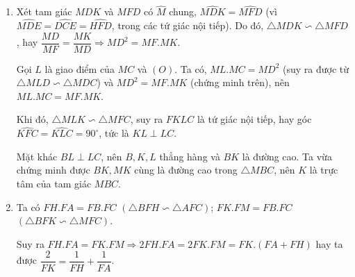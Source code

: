 \begin{ex}
{\begin{enumerate}
			Từ $(1),(2)$, kết hợp với $\widehat{MAD}+\widehat{DCO}=\widehat{FAC}+\widehat{ACF}=90^{\circ}$ ta được $\widehat{MDA}+\widehat{ODC}=90^{\circ}$, hay góc $\widehat{MDO}=90^{\circ}$, suy ra $MD\perp OD$.
			
			Chứng minh tương tự ta suy ra được $ME\perp OE,\widehat{MEO}=90^{\circ}$, cùng với $\widehat{MFO}=90^{\circ}$, ta suy ra  $ 5 $ điểm $M,D,O,F,E$ cùng thuộc đường tròn đường kính $OM$.
			\item 
			Xét tam giác $MDK$ và $MFD$ có $\widehat{M}$ chung, $\widehat{MDK}=\widehat{MFD}$ (vì $\widehat{MDE}=\widehat{DCE}=\widehat{HFD}$, trong các tứ giác nội tiếp). Do đó, $\triangle MDK\backsim \triangle MFD$, hay $\dfrac{MD}{MF}=\dfrac{MK}{MD}\Rightarrow MD^2=MF.MK$.
			
			Gọi $L$ là giao điểm của $MC$ và $(O)$. Ta có, $ML.MC=MD^2$ (suy ra được từ $\triangle MLD\backsim \triangle MDC$) và $MD^2=MF.MK$ (chứng minh trên), nên $ML.MC=MF.MK$.  
			
			Khi đó, $\triangle MLK\backsim \triangle MFC$, suy ra $FKLC$ là tứ giác nội tiếp, hay góc $\widehat{KFC}=\widehat{KLC}=90^{\circ}$, tức là $KL\perp LC$.
			 
			 Mặt khác $BL\perp LC$, nên $B,K,L$ thẳng hàng và $BK$ là đường cao. Ta vừa chứng minh được $BK, MK$ cùng là đường cao trong $\triangle MBC$, nên $K$ là trực tâm của tam giác $MBC$.
			\item 
			Ta có $FH.FA=FB.FC$ $(\triangle BFH\backsim\triangle AFC)$; $FK.FM=FB.FC$ $(\triangle BFK\backsim\triangle MFC)$.
			
			Suy ra $FH.FA=FK.FM\Rightarrow 2FH.FA=2FK.FM=FK.(FA+FH)$ hay ta được $\dfrac{2}{FK}=\dfrac{1}{FH}+\dfrac{1}{FA}$.
	
\end{enumerate}

}
\end{ex}


